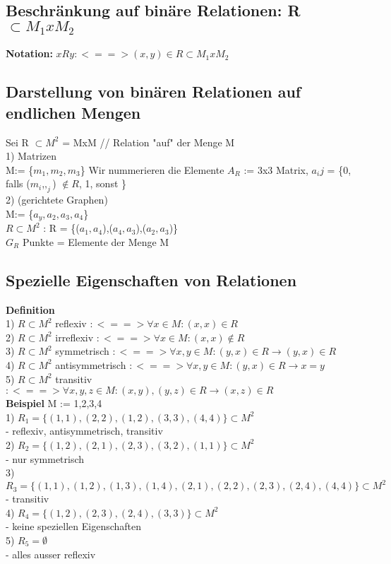 \documentclass[11pt,a4paper]{article}
\begin{document}
\subsection{Beschränkung auf binäre Relationen: R $\subset M_1xM_2$}
\textbf{Notation:} $ xRy : <==> (x,y) \in R \subset M_1 x M_2$ \\
\subsection{Darstellung von binären Relationen auf endlichen Mengen}
Sei {R} $\subset M^2$ = MxM // Relation "auf" der Menge M \\
1) Matrizen\\
M:= \{$m_1,m_2,m_3$\} Wir nummerieren die Elemente
$A_R$ := 3x3 Matrix, $a_ij$ = \{0, falls ($m_i$,$,_j$) $\not\in R$, 1, sonst \}\\
2) (gerichtete Graphen) \\
M:= \{$a_y,a_2,a_3,a_4$\}\\
$R\subset M^2$ : R = \{($a_1,a_4$),($a_4,a_3$),($a_2,a_3$)\}\\
$G_R$ Punkte = Elemente der Menge M

\subsection{Spezielle Eigenschaften von Relationen}
\textbf{Definition}\\
1) $R \subset M^2$ reflexiv $: <==> \forall x \in M : (x,x) \in R$ \\
2) $R \subset M^2$ irreflexiv $: <==> \forall x \in M : (x,x) \not\in R$ \\
3) $R \subset M^2$ symmetrisch $: <==> \forall x,y \in M : (y,x) \in R \rightarrow (y,x) \in R$ \\
4) $R \subset M^2$ antisymmetrisch $: <==> \forall x,y \in M : (y,x) \in R \rightarrow x=y $\\
5) $R \subset M^2$ transitiv $: <==> \forall x,y,z \in M : (x,y),(y,z) \in R \rightarrow (x,z)\in R$ \\

\textbf{Beispiel} M := {1,2,3,4}\\
1) $R_1 = \{ (1,1),(2,2),(1,2),(3,3),(4,4)\} \subset M^2$\\
- reflexiv, antisymmetrisch, transitiv\\
2) $R_2 = \{ (1,2),(2,1),(2,3),(3,2),(1,1)\} \subset M^2$\\
- nur symmetrisch\\
3) $R_3 = \{ (1,1),(1,2),(1,3),(1,4),(2,1),(2,2),(2,3),(2,4),(4,4)\} \subset M^2$\\
- transitiv \\
4) $R_4 = \{ (1,2),(2,3),(2,4),(3,3)\} \subset M^2$\\
- keine speziellen Eigenschaften\\
5) $R_5 = \emptyset $\\
- alles ausser reflexiv
\end{document}
